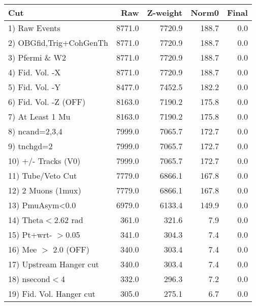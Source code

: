  \begin{table}[h!]\centering
 \begin{tabular}{||l||r|r|r|r||}
 \hline
 \hline
 Cut & Raw & Z-weight & Norm0 & Final \\
 \hline
  1) Raw Events           &      8771.0 &      7720.9 &       188.7 &         0.0 \\
  2) OBGfid,Trig+CohGenTh &      8771.0 &      7720.9 &       188.7 &         0.0 \\
  3) Pfermi \& W2         &      8771.0 &      7720.9 &       188.7 &         0.0 \\
  4) Fid. Vol. -X         &      8771.0 &      7720.9 &       188.7 &         0.0 \\
  5) Fid. Vol. -Y         &      8477.0 &      7452.5 &       182.2 &         0.0 \\
  6) Fid. Vol. -Z (OFF)   &      8163.0 &      7190.2 &       175.8 &         0.0 \\
  7) At Least 1 Mu        &      8163.0 &      7190.2 &       175.8 &         0.0 \\
  8) ncand=2,3,4          &      7999.0 &      7065.7 &       172.7 &         0.0 \\
  9) tnchgd=2             &      7999.0 &      7065.7 &       172.7 &         0.0 \\
 10) +/- Tracks (V0)      &      7999.0 &      7065.7 &       172.7 &         0.0 \\
 11) Tube/Veto Cut        &      7779.0 &      6866.1 &       167.8 &         0.0 \\
 12) 2 Muons (1mux)       &      7779.0 &      6866.1 &       167.8 &         0.0 \\
 13) PmuAsym<0.0          &      6979.0 &      6133.4 &       149.9 &         0.0 \\
 14) Theta$<$2.62 rad     &       361.0 &       321.6 &         7.9 &         0.0 \\
 15) Pt+wrt- $>$0.05      &       341.0 &       304.3 &         7.4 &         0.0 \\
 16) Mee $>$ 2.0  (OFF)   &       340.0 &       303.4 &         7.4 &         0.0 \\
 17) Upstream Hanger cut  &       340.0 &       303.4 &         7.4 &         0.0 \\
 18) nsecond$<$4          &       332.0 &       296.3 &         7.2 &         0.0 \\
 19) Fid. Vol. Hanger cut &       305.0 &       275.1 &         6.7 &         0.0 \\

\end{tabular}
\end{table}
